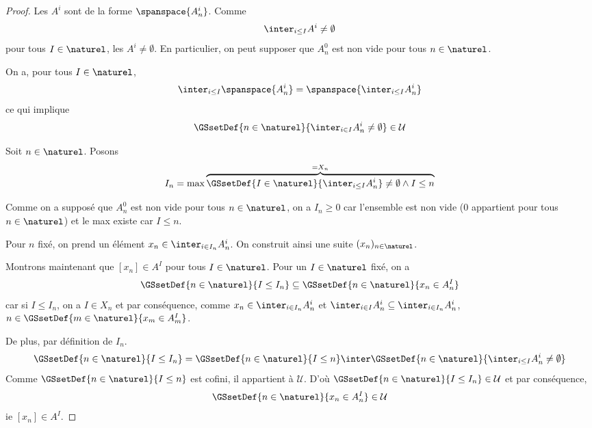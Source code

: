 \documentclass[a4paper, 12pt]{report}
\begin{document}
\ifdefined\outputproof
\begin{proof}
	Les $A^{i}$ sont de la forme $\spanspace{A^{i}_{n}}$. Comme
	\begin{equation}
		\inter_{i \leq I} A^{i} \neq \emptyset
	\end{equation}
	pour tous $I \in \naturel$, les $A^{i} \neq
	\emptyset$. En particulier, on peut supposer que $A^{0}_{n}$ est non vide
	pour tous $n \in \naturel$.

	On a, pour tous $I \in \naturel$,
	\begin{equation}
		\inter_{i \leq I} \spanspace{A^{i}_{n}} = \spanspace{\inter_{i \leq I}
		A^{i}_{n}}
	\end{equation}
	ce qui implique
	\begin{equation}
		\GSsetDef{n \in \naturel}{\inter_{i \in I} A^{i}_{n} \neq \emptyset} \in
		\mathcal{U}
	\end{equation}

	Soit $n \in \naturel$. Posons
	\begin{equation}
		I_{n} = \max \overbrace{\GSsetDef{I \in \naturel}{\inter_{i \leq I}
		A^{i}_{n}} \neq \emptyset \wedge I \leq n}^{= X_{n}}
	\end{equation}

	Comme on a supposé que $A^{0}_{n}$ est non vide pour tous $n \in \naturel$,
	on a $I_{n} \geq 0$ car l'ensemble est non vide ($0$ appartient pour tous $n
	\in \naturel$) et le max existe car $I \leq n$.

	Pour $n$ fixé, on prend un élément $x_{n} \in \inter_{i \in I_{n}}
	A^{i}_{n}$. On construit ainsi une suite $(x_{n})_{n \in \naturel}$.

	Montrons maintenant que $[x_{n}] \in A^{I}$ pour tous $I \in \naturel$. Pour
	un $I \in \naturel$ fixé, on a
	\begin{equation}
		\GSsetDef{n \in \naturel}{I \leq I_{n}} \subseteq \GSsetDef{n \in
		\naturel}{x_{n} \in A^{I}_{n}}
	\end{equation}
	car si $I \leq I_{n}$, on a $I \in X_{n}$ et par conséquence, comme $x_{n}
	\in \inter_{i \in I_{n}} A^{i}_{n}$ et $\inter_{i \in I} A^{i}_{n} \subseteq \inter_{i
		\in I_{n}} A^{i}_{n}$, $n \in \GSsetDef{m \in \naturel}{x_{m} \in
		A^{I}_{m}}$.

	De plus, par définition de $I_{n}$.
	\begin{equation}
		\GSsetDef{n \in \naturel}{I \leq I_{n}} = \GSsetDef{n \in \naturel}{I
		\leq n} \inter \GSsetDef{n \in \naturel}{\inter_{i \leq I} A^{i}_{n}
	\neq \emptyset}
	\end{equation}
	Comme $\GSsetDef{n \in \naturel}{I \leq n}$ est cofini, il appartient à
	$\mathcal{U}$. D'où $\GSsetDef{n \in \naturel}{I \leq I_{n}} \in
	\mathcal{U}$ et par conséquence,
	\begin{equation}
		\GSsetDef{n \in \naturel}{x_{n} \in A^{I}_{n}} \in \mathcal{U}
	\end{equation}
	ie $[x_{n}] \in A^{I}$.
\end{proof}
\fi
\end{document}
